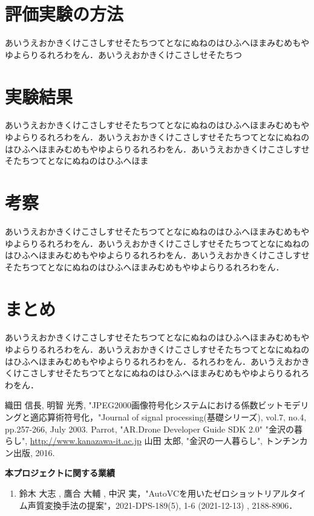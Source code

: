 \begin{multicols*}{2}
	\section{評価実験の方法}
	あいうえおかきくけこさしすせそたちつてとなにぬねのはひふへほまみむめもやゆよらりるれろわをん．あいうえおかきくけこさしせそたちつ

	
		\section{実験結果}
	あいうえおかきくけこさしすせそたちつてとなにぬねのはひふへほまみむめもやゆよらりるれろわをん．あいうえおかきくけこさしすせそたちつてとなにぬねのはひふへほまみむめもやゆよらりるれろわをん．あいうえおかきくけこさしすせそたちつてとなにぬねのはひふへほま	
	\section{考察}
		あいうえおかきくけこさしすせそたちつてとなにぬねのはひふへほまみむめもやゆよらりるれろわをん．あいうえおかきくけこさしすせそたちつてとなにぬねのはひふへほまみむめもやゆよらりるれろわをん．あいうえおかきくけこさしすせそたちつてとなにぬねのはひふへほまみむめもやゆよらりるれろわをん．
	\section{まとめ}
		あいうえおかきくけこさしすせそたちつてとなにぬねのはひふへほまみむめもやゆよらりるれろわをん．あいうえおかきくけこさしすせそたちつてとなにぬねのはひふへほまみむめもやゆよらりるれろわをん．るれろわをん．あいうえおかきくけこさしすせそたちつてとなにぬねのはひふへほまみむめもやゆよらりるれろわをん．

\begin{thebibliography}{99}
 織田 信長, 明智 光秀, "JPEG2000画像符号化システムにおける係数ビットモデリングと適応算術符号化，"Journal of signal processing(基礎シリーズ), vol.7, no.4, pp.257-266, July 2003.
Parrot, "AR.Drone Developer Guide SDK 2.0"
 "金沢の暮らし", \url{http://www.kanazawa-it.ac.jp}
 山田 太郎, "金沢の一人暮らし", トンチンカン出版, 2016.
\end{thebibliography}

\noindent\textbf{本プロジェクトに関する業績} %
\begin{enumerate}[label=\arabic*),leftmargin=2.25\zw]
\item 鈴木 大志 , 鷹合 大輔 , 中沢 実，"AutoVCを用いたゼロショットリアルタイム声質変換手法の提案"，2021-DPS-189(5), 1-6 (2021-12-13) , 2188-8906．
\end{enumerate}

\end{multicols*} 


